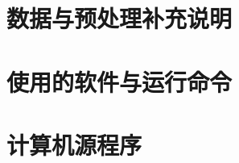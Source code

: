 \section{数据与预处理补充说明}\label{app:data}
\writingplaceholder

\section{使用的软件与运行命令}\label{app:software}
\writingplaceholder

\section{计算机源程序}\label{app:code}
\writingplaceholder
